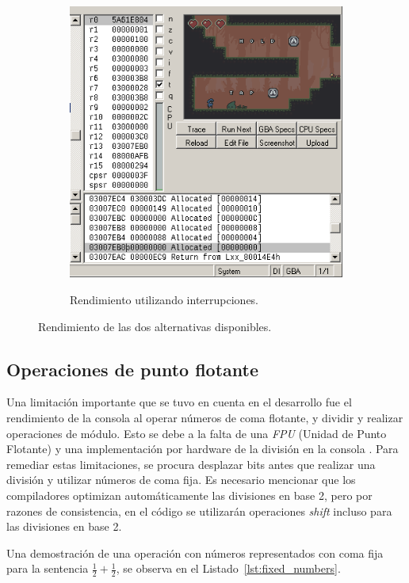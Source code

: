 \begin{figure}[h]
\begin{subfigure}[b]{0.45\textwidth}
		\includegraphics[width=\textwidth]{capitulos/capitulo5/with_irq.png}
		\label{fig:with_irq}
		\caption{Rendimiento utilizando interrupciones.}
	\end{subfigure}
	\caption{Rendimiento de las dos alternativas disponibles.}
	\label{fig:vsync_irq}
\end{figure}

\subsection{Operaciones de punto flotante}
Una limitación importante que se tuvo en cuenta en el desarrollo fue el rendimiento de la consola al operar números de coma flotante, y dividir y realizar operaciones de módulo. Esto se debe a la falta de una \textit{FPU} (Unidad de Punto Flotante) y una implementación por hardware de la división en la consola \cite{bib:tonc}. Para remediar estas limitaciones, se procura desplazar bits antes que realizar una división y utilizar números de coma fija. Es necesario mencionar que los compiladores optimizan automáticamente las divisiones en base 2, pero por razones de consistencia, en el código se utilizarán operaciones \textit{shift} incluso para las divisiones en base 2.

Una demostración de una operación con números representados con coma fija para la sentencia $\frac{1}{2}+\frac{1}{2}$, se observa en el Listado~\ref{lst:fixed_numbers}.

